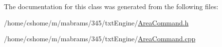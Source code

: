 \-The documentation for this class was generated from the following files\-:\begin{DoxyCompactItemize}
\item 
/home/cshome/m/mabrams/345/txt\-Engine/\hyperlink{_area_command_8h}{\-Area\-Command.\-h}\item 
/home/cshome/m/mabrams/345/txt\-Engine/\hyperlink{_area_command_8cpp}{\-Area\-Command.\-cpp}\end{DoxyCompactItemize}
